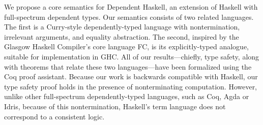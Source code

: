 We propose a core semantics for Dependent Haskell, an extension of Haskell
with full-spectrum dependent types. Our semantics consists of two related
languages. The first is a Curry-style dependently-typed language with
nontermination, irrelevant arguments, and equality abstraction. The second,
inspired by the Glasgow Haskell Compiler's core language FC, is its
explicitly-typed analogue, suitable for implementation in GHC. All of our
results---chiefly, type safety, along with theorems that relate these two
languages---have been formalized using the Coq proof assistant. Because our
work is backwards compatible with Haskell, our type safety proof holds in the
presence of nonterminating computation. However, unlike other full-spectrum
dependently-typed languages, such as Coq, Agda or Idris, because of this
nontermination, Haskell's term language does not correspond to a consistent
logic.
